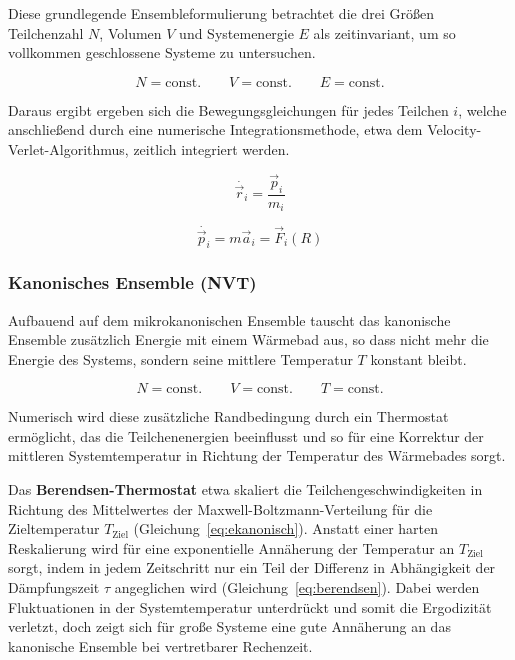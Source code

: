 Diese grundlegende Ensembleformulierung betrachtet die drei Größen Teilchenzahl $N$, Volumen $V$ und Systemenergie $E$ als zeitinvariant, um so vollkommen geschlossene Systeme zu untersuchen.

\begin{equation}
  N = \text{const.}
  \qquad
  V = \text{const.}
  \qquad
  E = \text{const.}
\end{equation}

Daraus ergibt ergeben sich die Bewegungsgleichungen für jedes Teilchen $i$, welche anschließend durch eine numerische Integrationsmethode, etwa dem Velocity-Verlet-Algorithmus, zeitlich integriert werden.

\begin{equation}
  \dot{\vec r_i} = \frac{\vec p_i}{m_i}
\end{equation}

\begin{equation}
  \dot{\vec p_i} = m \vec a_i = \vec F_i(R)
\end{equation}

\subsubsection{Kanonisches Ensemble (NVT)}

Aufbauend auf dem mikrokanonischen Ensemble tauscht das kanonische Ensemble zusätzlich Energie mit einem Wärmebad aus, so dass nicht mehr die Energie des Systems, sondern seine mittlere Temperatur $T$ konstant bleibt.

\begin{equation}
  N = \text{const.}
  \qquad
  V = \text{const.}
  \qquad
  T = \text{const.}
\end{equation}

Numerisch wird diese zusätzliche Randbedingung durch ein Thermostat ermöglicht, das die Teilchenenergien beeinflusst und so für eine Korrektur der mittleren Systemtemperatur in Richtung der Temperatur des Wärmebades sorgt.

Das \textbf{Berendsen-Thermostat}\cite{berendsen_molecular_1984} etwa skaliert die Teilchengeschwindigkeiten in Richtung des Mittelwertes der Maxwell-Boltzmann-Verteilung für die Zieltemperatur $T_\text{Ziel}$ (Gleichung~\ref{eq:ekanonisch}).
Anstatt einer harten Reskalierung wird für eine exponentielle Annäherung der Temperatur an $T_\text{Ziel}$ sorgt, indem in jedem Zeitschritt nur ein Teil der Differenz in Abhängigkeit der Dämpfungszeit $\tau$ angeglichen wird (Gleichung~\ref{eq:berendsen}).
Dabei werden Fluktuationen in der Systemtemperatur unterdrückt und somit die Ergodizität verletzt, doch zeigt sich für große Systeme eine gute Annäherung an das kanonische Ensemble bei vertretbarer Rechenzeit.

